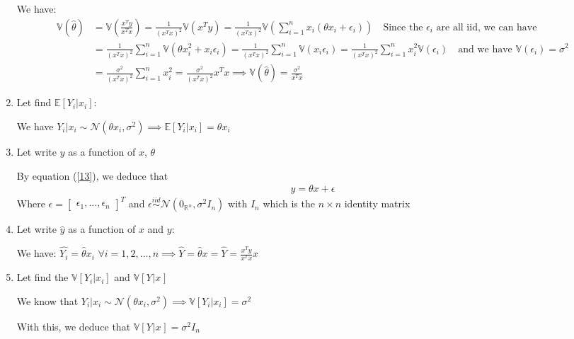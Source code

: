 \documentclass[12pt,a4paper]{article}
\begin{document}
\begin{enumerate}
We have:\begin{align*}
	\mathbb{V}(\hat{\theta}) &= \mathbb{V}\left(\frac{x^{T}y}{x^{T}x}\right) = \frac{1}{(x^{T}x)^{2}}\mathbb{V}(x^{T}y) = \frac{1}{(x^{T}x)^{2}}\mathbb{V}(\sum_{i=1}^{n}x_{i}(\theta x_{i}+\epsilon_{i}))\quad\text{Since the $\epsilon_{i}$ are all iid, we can have}\\ &=\frac{1}{(x^{T}x)^{2}}\sum_{i=1}^{n}\mathbb{V}(\theta x_{i}^{2}+ x_{i}\epsilon_{i}) = \frac{1}{(x^{T}x)^{2}}\sum_{i=1}^{n}\mathbb{V}(x_{i}\epsilon_{i})=\frac{1}{(x^{T}x)^{2}}\sum_{i=1}^{n}x_{i}^{2}\mathbb{V}(\epsilon_{i})\quad\text{and we have $\mathbb{V}(\epsilon_{i}) = \sigma^{2}$}\\
	&=\frac{\sigma^{2}}{(x^{T}x)^{2}}\sum_{i=1}^{n}x_{i}^{2}=\frac{\sigma^{2}}{(x^{T}x)^{2}}x^{T}x \implies\mathbb{V}(\hat{\theta})= \frac{\sigma^{2}}{x^{T}x}
\end{align*}

\item Let find $\mathbb{E}[Y_{i}|x_{i}]$:

We have $Y_{i}|x_{i}\sim \mathcal{N}(\theta x_{i},\sigma^{2})\implies\mathbb{E}[Y_{i}|x_{i}] = \theta x_{i} $

\item Let write $y$ as a function of $x$, $\theta$

By equation (\ref{13}), we deduce that \begin{align}
	y = \theta x+\epsilon
\end{align}
Where $\epsilon=\begin{bmatrix}
	\epsilon_{1},\dots,\epsilon_{n}
\end{bmatrix}^{T}$ and $\epsilon\overset{iid}{\sim}\mathcal{N}(0_{\mathbb{R^{}}^{n}},\sigma^{2}I_{n})$ with $I_{n}$ which is the $n\times n$ identity matrix

\item Let write $\hat{y}$ as a function of $x$ and $y$:

We have: $\widehat{Y_{i}}=\widehat{\theta}x_{i}$ $\forall i = 1,2,\dots,n\implies \widehat{Y}=\widehat{\theta}x = \widehat{Y}=\frac{x^{T}y}{x^{T}x}x$

\item Let find the $\mathbb{V}[Y_{i}|x_{i}] $ and $\mathbb{V}[Y_{}|x_{}] $

We know that $Y_{i}|x_{i}\sim \mathcal{N}(\theta x_{i},\sigma^{2})\implies \mathbb{V}[Y_{i}|x_{i}] = \sigma^{2} $

With this, we deduce that $\mathbb{V}[Y_{}|x_{}] =\sigma^{2}I_{n} $



\end{enumerate}
\end{document}
